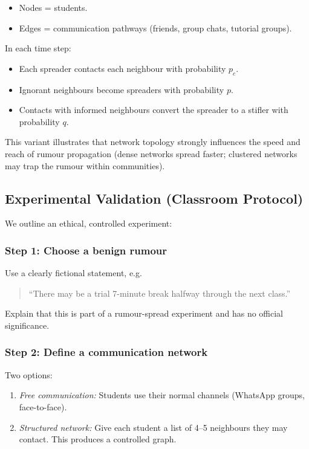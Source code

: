 \documentclass[11pt]{article}
\begin{document}
\begin{itemize}
    \item Nodes = students.
    \item Edges = communication pathways (friends, group chats, tutorial groups).
\end{itemize}

In each time step:
\begin{itemize}
    \item Each spreader contacts each neighbour with probability $p_c$.
    \item Ignorant neighbours become spreaders with probability $p$.
    \item Contacts with informed neighbours convert the spreader to a
    stifler with probability $q$.
\end{itemize}

This variant illustrates that network topology strongly influences the
speed and reach of rumour propagation (dense networks spread faster;
clustered networks may trap the rumour within communities).

\subsection*{Experimental Validation (Classroom Protocol)}

We outline an ethical, controlled experiment:

\subsubsection*{Step 1: Choose a benign rumour}
Use a clearly fictional statement, e.g.
\begin{quote}
``There may be a trial 7-minute break halfway through the next class.''
\end{quote}
Explain that this is part of a rumour-spread experiment and has no
official significance.

\subsubsection*{Step 2: Define a communication network}

Two options:
\begin{enumerate}
    \item \emph{Free communication:} Students use their normal channels
    (WhatsApp groups, face-to-face).
    \item \emph{Structured network:} Give each student a list of 4--5
    neighbours they may contact. This produces a controlled graph.
\end{enumerate}
\end{document}
